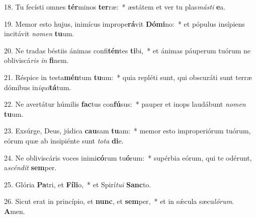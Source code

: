 18. Tu fecísti omnes \textbf{tér}minos \textbf{ter}ræ:~*  æstátem et ver tu plas\textit{más}\textit{ti} \textbf{e}a.\

19. Memor esto hujus, inimícus imprope\textbf{rá}vit \textbf{Dó}\textbf{mi}no:~*  et pópulus insípiens incitávit \textit{no}\textit{men} \textbf{tu}um.\

20. Ne tradas béstiis ánimas confi\textbf{tén}tes \textbf{ti}bi,~*  et ánimas páuperum tuórum ne obliviscá\textit{ris} \textit{in} \textbf{fi}nem.\

21. Réspice in testa\textbf{mén}tum \textbf{tu}um:~*  quia repléti sunt, qui obscuráti sunt terræ dómibus in\textit{i}\textit{qui}\textbf{tá}tum.\

22. Ne avertátur húmilis \textbf{fac}tus con\textbf{fú}sus:~*  pauper et inops laudábunt \textit{no}\textit{men} \textbf{tu}um.\

23. Exsúrge, Deus, júdica \textbf{cau}sam \textbf{tu}am:~*  memor esto improperiórum tuórum, eórum quæ ab insipiénte sunt \textit{to}\textit{ta} \textbf{di}e.\

24. Ne obliviscáris voces inimi\textbf{có}rum tu\textbf{ó}rum:~*  supérbia eórum, qui te odérunt, a\textit{scén}\textit{dit} \textbf{sem}per.\

25. Glória \textbf{Pa}tri, et \textbf{Fí}\textbf{li}o,~*  et Spirí\textit{tu}\textit{i} \textbf{Sanc}to.\

26. Sicut erat in princípio, et \textbf{nunc}, et \textbf{sem}per,~*  et in sǽcula sæcu\textit{ló}\textit{rum}. \textbf{A}men.\

